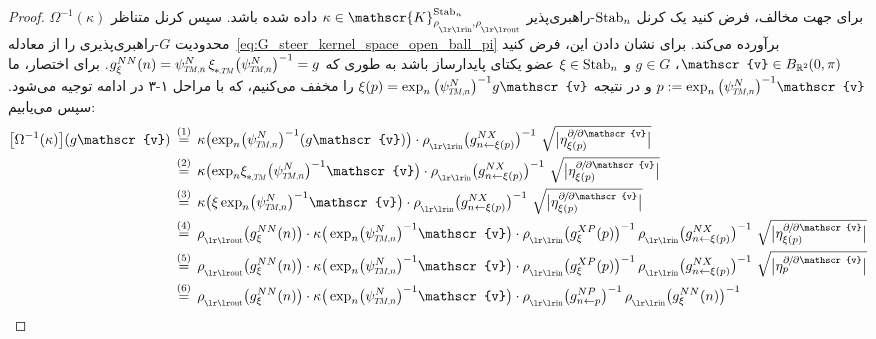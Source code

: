 \begin{proof}
    برای جهت مخالف، فرض کنید یک کرنل $\operatorname{Stab}_{n}$-راهبری‌پذیر $\kappa\in \mathscr{K}^{\Stab{n}}_{\rhoin\mkern-1mu,\rhoout}$ داده شده باشد.
    سپس کرنل متناظر $\Omega^{-1}(\kappa)$ محدودیت $G$-راهبری‌پذیری را از معادله~\eqref{eq:G_steer_kernel_space_open_ball_pi} برآورده می‌کند.
    برای نشان دادن این، فرض کنید $\mathscr{v} \in B_{\R^2}\mkern-1mu(0,\pi)$، $g\in G$ و $\xi\in\operatorname{Stab}_{n}$ عضو یکتای پایدارساز باشد به طوری که $g_\xi^{NN}(n) = \psiTMn^N\, \dxiTM \big(\psiTMn^N\big)^{-1} = g$.
    برای اختصار، ما $p := \exp_n \big(\psiTMn^N\big)^{-1} \mathscr{v}$ و در نتیجه $\xi(p) = \exp_n \big(\psiTMn^N\big)^{-1} g\mathscr{v}$ را مخفف می‌کنیم، که با مراحل ۱-۳ در ادامه توجیه می‌شود.
    سپس می‌یابیم:
    \begin{align}
        \big[\Omega^{-1}(\kappa)\big](g\mathscr{v})
        \,&\overset{(1)}{=}\, \kappa\big(\! \exp_n\! \big(\psiTMn^N\big)^{-1} (g\mathscr{v}) \big) \cdot \rhoin\big( g_{n\leftarrow\xi(p)}^{NX} \big)^{-1}
            \ \sqrt{\big|\eta_{\xi(p)}^{\partial\mkern-2mu/\mkern-2mu\partial\mathscr{v}}\big|} \notag \\
        \,&\overset{(2)}{=}\, \kappa\big(\! \exp_n\! \dxiTM \big(\psiTMn^N\big)^{-1} \mathscr{v} \big) \cdot \rhoin\big( g_{n\leftarrow\xi(p)}^{NX} \big)^{-1}
            \ \sqrt{\big|\eta_{\xi(p)}^{\partial\mkern-2mu/\mkern-2mu\partial\mathscr{v}}\big|} \notag \\
        \,&\overset{(3)}{=}\, \kappa\big(\xi \exp_n\! \big(\psiTMn^N\big)^{-1} \mathscr{v} \big) \cdot \rhoin\big( g_{n\leftarrow\xi(p)}^{NX} \big)^{-1}
            \ \sqrt{\big|\eta_{\xi(p)}^{\partial\mkern-2mu/\mkern-2mu\partial\mathscr{v}}\big|} \notag \\
        \,&\overset{(4)}{=}\, \rhoout\big( g_\xi^{NN}(n) \big) \cdot \kappa\big(\exp_n\! \big(\psiTMn^N\big)^{-1} \mathscr{v} \big) \cdot \rhoin\big( g_\xi^{XP}(p) \big)^{-1}\, \rhoin\big( g_{n\leftarrow\xi(p)}^{NX} \big)^{-1}
            \ \sqrt{\big|\eta_{\xi(p)}^{\partial\mkern-2mu/\mkern-2mu\partial\mathscr{v}}\big|} \notag \\
        \,&\overset{(5)}{=}\, \rhoout\big( g_\xi^{NN}(n) \big) \cdot \kappa\big(\exp_n\! \big(\psiTMn^N\big)^{-1} \mathscr{v} \big) \cdot \rhoin\big( g_\xi^{XP}(p) \big)^{-1}\, \rhoin\big( g_{n\leftarrow\xi(p)}^{NX} \big)^{-1}
            \ \sqrt{\big|\eta_p^{\partial\mkern-2mu/\mkern-2mu\partial\mathscr{v}}\big|} \notag \\
        \,&\overset{(6)}{=}\, \rhoout\big( g_\xi^{NN}(n) \big) \cdot \kappa\big(\exp_n\! \big(\psiTMn^N\big)^{-1} \mathscr{v} \big) \cdot \rhoin\big( g_{n\leftarrow p}^{NP} \big)^{-1}\, \rhoin\big( g_\xi^{NN}(n) \big)^{-1}

\end{align}
\end{proof}
